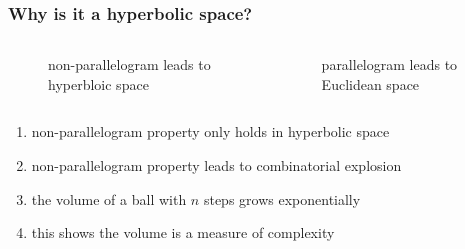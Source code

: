\documentclass[aspectratio=169]{beamer}
\begin{document}
\begin{frame}
    \frametitle{Why is it a hyperbolic space?}
    \begin{columns}
        \begin{column}{0.5\textwidth}
            \begin{figure}[ht]\centering
            \caption{non-parallelogram leads to hyperbloic space}
            \end{figure}
        \end{column}
        \begin{column}{0.5\textwidth}
            \begin{figure}[ht]\centering
            \caption{parallelogram leads to Euclidean space}
            \end{figure}
        \end{column}
    \end{columns}
    \begin{center}
        \begin{enumerate}
            \item non-parallelogram property only holds in hyperbolic space
            \item non-parallelogram property leads to combinatorial explosion
            \item the volume of a ball with $n$ steps grows exponentially
            \item this shows the volume is a measure of complexity
        \end{enumerate}
    \end{center}
\end{frame}
\end{document}
